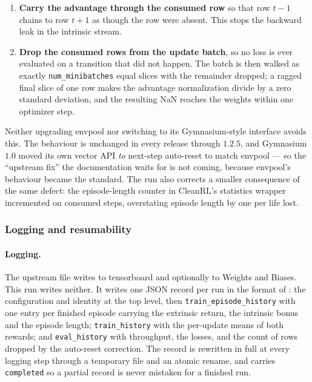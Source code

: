 \begin{enumerate}[label=\arabic*.,leftmargin=*]
\item \textbf{Carry the advantage through the consumed row} so that row $t-1$ chains to row $t+1$ as
  though the row were absent. This stops the backward leak in the intrinsic stream.
\item \textbf{Drop the consumed rows from the update batch}, so no loss is ever evaluated on a
  transition that did not happen. The batch is then walked as exactly \texttt{num\_minibatches} equal
  slices with the remainder dropped; a ragged final slice of one row makes the advantage
  normalization divide by a zero standard deviation, and the resulting NaN reaches the weights within
  one optimizer step.
\end{enumerate}

Neither upgrading envpool nor switching to its Gymnasium-style interface avoids this. The behaviour
is unchanged in every release through $1.2.5$, and Gymnasium $1.0$ moved its own vector API
\emph{to} next-step auto-reset to match envpool --- so the ``upstream fix'' the documentation waits
for is not coming, because envpool's behaviour became the standard. The run also corrects a smaller
consequence of the same defect: the episode-length counter in CleanRL's statistics wrapper
incremented on consumed steps, overstating episode length by one per life lost.

\subsubsection{Logging and resumability}
\label{sec:cleanrl-resume}

\paragraph{Logging.}
The upstream file writes to tensorboard and optionally to Weights and Biases. This run writes
neither. It writes one JSON record per run in the format of : the configuration and
identity at the top level, then \texttt{train\_\allowbreak episode\_\allowbreak history} with one
entry per finished episode carrying the extrinsic return, the intrinsic bonus and the episode length;
\texttt{train\_\allowbreak history} with the per-update means of both rewards; and
\texttt{eval\_\allowbreak history} with throughput, the losses, and the count of rows dropped by the
auto-reset correction. The record is rewritten in full at every logging step through a temporary file
and an atomic rename, and carries \texttt{completed} so a partial record is never mistaken for a
finished run.

